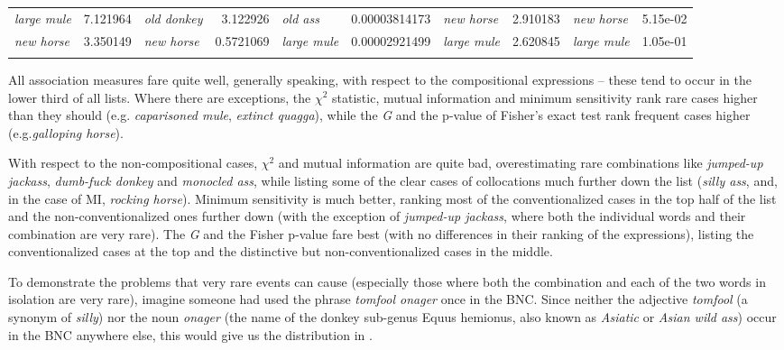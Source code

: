 \begin{sidewaystable}
{\begin{tabular}[t]{lS[table-format=5.2]lrlrlrlS[table-format=1.2e-3]}
\textit{large mule} & 7.121964 & \textit{old donkey} & \num{3.122926} & \textit{old ass} & \num[round-mode=places,round-precision=6]{0.00003814173} & \textit{new horse} & \num{2.910183} & \textit{new horse} & 5.15e-02 \\
\textit{new horse} & 3.350149 & \textit{new horse} & \num{0.5721069} & \textit{large mule} & \num[round-mode=places,round-precision=6]{0.00002921499} & \textit{large mule} & \num{2.620845} & \textit{large mule} & 1.05e-01 \\
\lspbottomrule
\end{tabular}}
\end{sidewaystable}

All association  measures  fare quite well, generally speaking, with respect to the compositional  expressions -- these tend to occur in the lower third of all lists. Where there are exceptions, the $\chi^2$ statistic,  mutual information  and minimum sensitivity  rank rare cases higher than they should (e.g. \textit{caparisoned mule}, \textit{extinct quagga}), while the \emph{G}  and the p\hyp{}value of Fisher's exact test  rank frequent cases higher (e.g.\textit{galloping horse}).

With respect to the non\hyp{}compositional  cases, $\chi^2$  and mutual information  are quite bad, overestimating rare combinations like \textit{jumped\hyp{}up jackass}, \textit{dumb\hyp{}fuck donkey} and \textit{monocled ass}, while listing some of the clear cases of collocations  much further down the list (\textit{silly ass}, and, in the case of MI, \textit{rocking horse}). Minimum sensitivity  is much better, ranking most of the conventionalized  cases in the top half of the list and the non\hyp{}conventionalized ones further down (with the exception of \textit{jumped\hyp{}up jackass}, where both the individual words and their combination are very rare). The \emph{G}  and the Fisher  p\hyp{}value fare best (with no differences in their ranking of the expressions), listing the conventionalized  cases at the top and the distinctive but non\hyp{}conventionalized cases in the middle.

To demonstrate the problems that very rare events can cause (especially those where both the combination and each of the two words in isolation are very rare), imagine someone had used the phrase \textit{tomfool onager} once in the BNC.  Since neither the adjective  \textit{tomfool} (a synonym  of \textit{silly}) nor the noun  \textit{onager} (the name of the donkey sub\hyp{}genus Equus hemionus, also known as \textit{Asiatic} or \textit{Asian wild ass}) occur in the BNC  anywhere else, this would give us the distribution  in .


